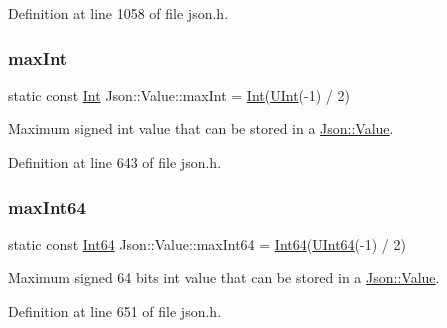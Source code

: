 Definition at line 1058 of file json.\+h.

\hypertarget{class_json_1_1_value_af13109d78a22923e397dc2b60a74714c}{}\label{class_json_1_1_value_af13109d78a22923e397dc2b60a74714c} 
\subsubsection{\texorpdfstring{max\+Int}{maxInt}}
{\footnotesize\ttfamily static const \hyperlink{class_json_1_1_value_abdf7a7ff73eb130ffcab28504ffdb405}{Int} Json\+::\+Value\+::max\+Int = \hyperlink{class_json_1_1_value_abdf7a7ff73eb130ffcab28504ffdb405}{Int}(\hyperlink{class_json_1_1_value_a0933d59b45793ae4aade1757c322a98d}{U\+Int}(-\/1) / 2)\hspace{0.3cm}{\ttfamily [static]}}



Maximum signed int value that can be stored in a \hyperlink{class_json_1_1_value}{Json\+::\+Value}. 



Definition at line 643 of file json.\+h.

\hypertarget{class_json_1_1_value_aa26897140547da2337772e39a8a68780}{}\label{class_json_1_1_value_aa26897140547da2337772e39a8a68780} 
\subsubsection{\texorpdfstring{max\+Int64}{maxInt64}}
{\footnotesize\ttfamily static const \hyperlink{class_json_1_1_value_a1b86af9f85f0f1baa972c3319fa22695}{Int64} Json\+::\+Value\+::max\+Int64 = \hyperlink{class_json_1_1_value_a1b86af9f85f0f1baa972c3319fa22695}{Int64}(\hyperlink{class_json_1_1_value_a8b62564be8c087c6d18de180ff4e13e3}{U\+Int64}(-\/1) / 2)\hspace{0.3cm}{\ttfamily [static]}}



Maximum signed 64 bits int value that can be stored in a \hyperlink{class_json_1_1_value}{Json\+::\+Value}. 



Definition at line 651 of file json.\+h.

\hypertarget{class_json_1_1_value_ad0396ec8811ace1287005f372f5edbf8}{}\label{class_json_1_1_value_ad0396ec8811ace1287005f372f5edbf8} 
